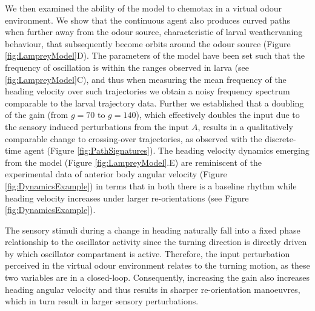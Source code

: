 \documentclass[11pt,a4paper]{article}
\newcommand{\todoBW}[1]{\todo[author=BW,color=orange, size=\tiny,inline]{#1}}
\newcommand{\todoML}[1]{\todo[author=ML,color=white, size=\tiny,inline]{#1}}
\begin{document}
We then examined the ability of the model to chemotax in a virtual odour environment. We show that the continuous agent also produces curved paths when further away from the odour source, characteristic of larval weathervaning behaviour, that subsequently become orbits around the odour source (Figure \ref{fig:LampreyModel}D).
 The parameters of the model have been set such that the frequency of oscillation is within the ranges observed in larva (see \ref{fig:LampreyModel}C), and thus when measuring the mean frequency of the heading velocity over such trajectories we obtain a noisy frequency spectrum comparable to the larval trajectory data. 
Further we established that a doubling of the gain (from $g=70$ to $g=140$), which effectively doubles the input due to the sensory induced perturbations from the input $A$, results in a qualitatively comparable change to crossing-over trajectories, as observed with the discrete-time agent (Figure \ref{fig:PathSignatures}).
 The heading velocity dynamics emerging from the model (Figure \ref{fig:LampreyModel}.E) are reminiscent of the experimental data of anterior body angular velocity (Figure \ref{fig:DynamicsExample}) in terms that in both there is a baseline rhythm while heading velocity increases under larger re-orientations (see Figure \ref{fig:DynamicsExample}).

 
The sensory stimuli during a change in heading naturally fall into a fixed phase relationship to the oscillator activity since the turning direction is directly driven by which oscillator compartment is active. Therefore, the input perturbation perceived in the virtual odour environment relates to the turning motion, as these two variables are in a closed-loop. 
Consequently, increasing the gain also increases heading angular velocity and thus results in sharper re-orientation manoeuvres, which in turn result in larger sensory perturbations.
 
\end{document}
